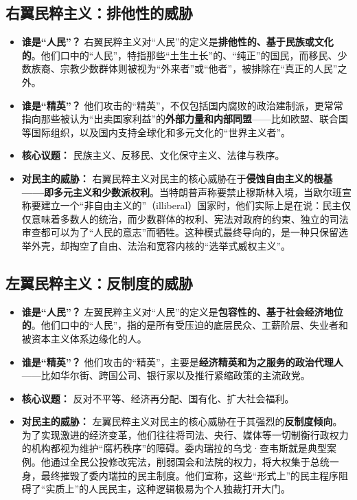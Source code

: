 \documentclass[a5paper, 11pt, openany]{ctexbook}
\begin{document}
\subsection{右翼民粹主义：排他性的威胁}
\begin{itemize}
    \item \textbf{谁是“人民”？} 右翼民粹主义对“人民”的定义是\textbf{排他性的、基于民族或文化的}。他们口中的“人民”，特指那些“土生土长”的、“纯正”的国民，而移民、少数族裔、宗教少数群体则被视为“外来者”或“他者”，被排除在“真正的人民”之外。
    \item \textbf{谁是“精英”？} 他们攻击的“精英”，不仅包括国内腐败的政治建制派，更常常指向那些被认为“出卖国家利益”的\textbf{外部力量和内部同盟}——比如欧盟、联合国等国际组织，以及国内支持全球化和多元文化的“世界主义者”。
    \item \textbf{核心议题：} 民族主义、反移民、文化保守主义、法律与秩序。
    \item \textbf{对民主的威胁：} 右翼民粹主义对民主的核心威胁在于\textbf{侵蚀自由主义的根基——即多元主义和少数派权利}。当特朗普声称要禁止穆斯林入境，当欧尔班宣称要建立一个“非自由主义的”（illiberal）国家时，他们实际上是在说：民主仅仅意味着多数人的统治，而少数群体的权利、宪法对政府的约束、独立的司法审查都可以为了“人民的意志”而牺牲。这种模式最终导向的，是一种只保留选举外壳，却掏空了自由、法治和宽容内核的“选举式威权主义”。
\end{itemize}

\subsection{左翼民粹主义：反制度的威胁}
\begin{itemize}
    \item \textbf{谁是“人民”？} 左翼民粹主义对“人民”的定义是\textbf{包容性的、基于社会经济地位的}。他们口中的“人民”，指的是所有受压迫的底层民众、工薪阶层、失业者和被资本主义体系边缘化的人。
    \item \textbf{谁是“精英”？} 他们攻击的“精英”，主要是\textbf{经济精英和为之服务的政治代理人}——比如华尔街、跨国公司、银行家以及推行紧缩政策的主流政党。
    \item \textbf{核心议题：} 反对不平等、经济再分配、国有化、扩大社会福利。
    \item \textbf{对民主的威胁：} 左翼民粹主义对民主的核心威胁在于其强烈的\textbf{反制度倾向}。为了实现激进的经济变革，他们往往将司法、央行、媒体等一切制衡行政权力的机构都视为维护“腐朽秩序”的障碍。委内瑞拉的乌戈·查韦斯就是典型案例。他通过全民公投修改宪法，削弱国会和法院的权力，将大权集于总统一身，最终摧毁了委内瑞拉的民主制度。他们宣称，这些“形式上”的民主程序阻碍了“实质上”的人民民主，这种逻辑极易为个人独裁打开大门。
\end{itemize}
\end{document}
